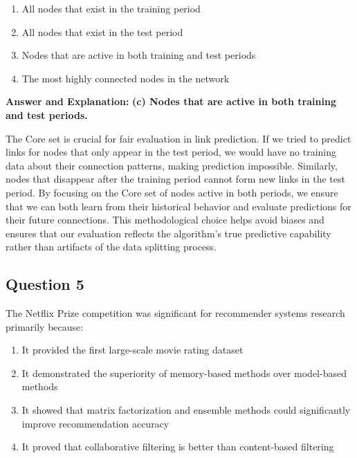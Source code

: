 \documentclass[11pt]{article}
\newenvironment{answer}{\color{answercolor}\begin{framed}\textbf{Answer and Explanation:}}{\end{framed}}
\begin{document}
\begin{enumerate}[label=(\alph*)]
\item All nodes that exist in the training period
\item All nodes that exist in the test period  
\item Nodes that are active in both training and test periods
\item The most highly connected nodes in the network
\end{enumerate}

\begin{answer}
\textbf{(c) Nodes that are active in both training and test periods.}

The Core set is crucial for fair evaluation in link prediction. If we tried to predict links for nodes that only appear in the test period, we would have no training data about their connection patterns, making prediction impossible. Similarly, nodes that disappear after the training period cannot form new links in the test period. By focusing on the Core set of nodes active in both periods, we ensure that we can both learn from their historical behavior and evaluate predictions for their future connections. This methodological choice helps avoid biases and ensures that our evaluation reflects the algorithm's true predictive capability rather than artifacts of the data splitting process.
\end{answer}

\subsection{Question 5}
The Netflix Prize competition was significant for recommender systems research primarily because:

\begin{enumerate}[label=(\alph*)]
\item It provided the first large-scale movie rating dataset
\item It demonstrated the superiority of memory-based methods over model-based methods
\item It showed that matrix factorization and ensemble methods could significantly improve recommendation accuracy
\item It proved that collaborative filtering is better than content-based filtering
\end{enumerate}
\end{document}
